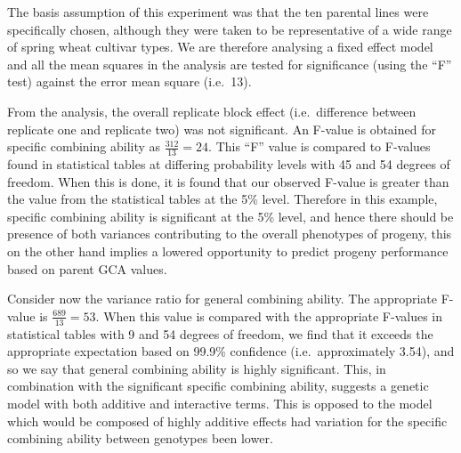 \documentclass[nofonts,]{tufte-handout}
\begin{document}
\begin{table}[t]

\caption{\label{tab:half-diallel-pht-anova}Degrees of freedom, sum of squares and mean squares from the analysis of variance of plant height of a half diallel including parent selfs. In the analysis, the total variance is partitioned into differences between the two replicate blocks (replication), general combining ability (Genotype male), specific combining ability (Genotype male:Genotype female) and an error term (based based on the replicate differences)}
\centering
{}
\end{table}

The basis assumption of this experiment was that the ten parental lines
were specifically chosen, although they were taken to be representative
of a wide range of spring wheat cultivar types. We are therefore
analysing a fixed effect model and all the mean squares in the analysis
are tested for significance (using the ``F'' test) against the error
mean square (i.e.~13).

From the analysis, the overall replicate block effect (i.e.~difference
between replicate one and replicate two) was not significant. An F-value
is obtained for specific combining ability as \(\frac{312}{13} = 24\).
This ``F'' value is compared to F-values found in statistical tables at
differing probability levels with 45 and 54 degrees of freedom. When
this is done, it is found that our observed F-value is greater than the
value from the statistical tables at the 5\% level. Therefore in this
example, specific combining ability is significant at the 5\% level, and
hence there should be presence of both variances contributing to the
overall phenotypes of progeny, this on the other hand implies a lowered
opportunity to predict progeny performance based on parent GCA values.

Consider now the variance ratio for general combining ability. The
appropriate F-value is \(\frac{689}{13} = 53\). When this value is
compared with the appropriate F-values in statistical tables with 9 and
54 degrees of freedom, we find that it exceeds the appropriate
expectation based on 99.9\% confidence (i.e.~approximately 3.54), and so
we say that general combining ability is highly significant. This, in
combination with the significant specific combining ability, suggests a
genetic model with both additive and interactive terms. This is opposed
to the model which would be composed of highly additive effects had
variation for the specific combining ability between genotypes been
lower.
\end{document}
